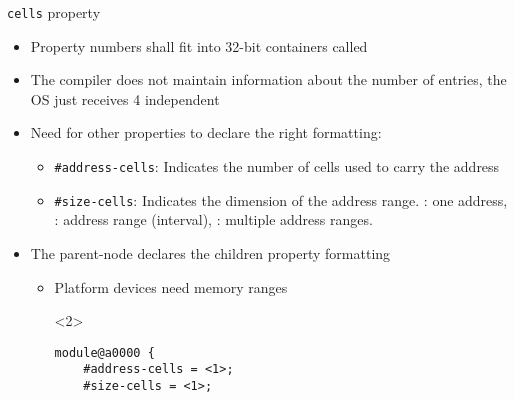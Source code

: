 \begin{frame}[fragile]{{\tt cells} property}
  \begin{itemize}
  \item Property numbers shall fit into 32-bit containers called
  \item The compiler does not maintain information about the number of
    entries, the OS just receives 4 independent 
    \begin{itemize}
    \end{itemize}
    \pause
  \item Need for other properties to declare the right formatting:
    \begin{itemize}
    \item {\tt \#address-cells}: Indicates the number of cells
      used to carry the address
    \item {\tt \#size-cells}: Indicates the dimension of the address range.
      : one address, : address range (interval),
      : multiple address ranges.
    \end{itemize}
  \item The parent-node declares the children  property
    formatting
    \begin{itemize}
    \item Platform devices need memory ranges
      \begin{onlyenv}<2>
        \begin{block}{}
\begin{verbatim}
module@a0000 {
    #address-cells = <1>;
    #size-cells = <1>;


\end{verbatim}
\end{block}
\end{onlyenv}
\end{itemize}
\end{itemize}
\end{frame}
